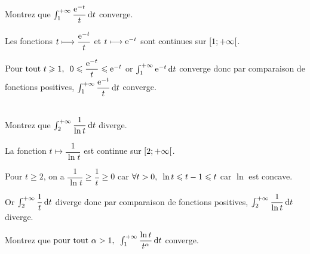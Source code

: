 \begin{exo}~\\
Montrez que \(\int_1^{\pinf}\dfrac{\e{-t}}{t}\odif{t}\) converge.
\end{exo}

\begin{corr}
Les fonctions \(t\longmapsto\dfrac{\mathrm{e}^{-t}}{t}\) et \(t\longmapsto\mathrm{e}^{-t}\) sont continues sur \(\left[1;+\infty\right[\).

\(\quantifs{\Tpt t\geq1}0\leq\dfrac{\e{-t}}{t}\leq\e{-t}\) or \(\int_1^{\pinf}\e{-t}\odif{t}\) converge donc par comparaison de fonctions positives, \(\int_1^{\pinf}\dfrac{\e{-t}}{t}\odif{t}\) converge.
\end{corr}

\begin{exo}~\\
Montrez que \(\int_2^{\pinf}\dfrac{1}{\ln t}\odif{t}\) diverge.
\end{exo}

\begin{corr}
La fonction \(t\mapsto\dfrac{1}{\ln t}\) est continue sur \(\left[2;+\infty\right[\).

Pour \(t\geq2\), on a \(\dfrac{1}{\ln t}\geq\dfrac{1}{t}\geq0\) car \(\quantifs{\forall t>0}\ln t\leq t-1\leq t\) car \(\ln\) est concave.

Or \(\int_2^{\pinf}\dfrac{1}{t}\odif{t}\) diverge donc par comparaison de fonctions positives, \(\int_2^{\pinf}\dfrac{1}{\ln t}\odif{t}\) diverge.
\end{corr}

\begin{exo}
Montrez que \(\quantifs{\tpt\alpha>1}\int_1^{\pinf}\dfrac{\ln t}{t^\alpha}\odif{t}\) converge.
\end{exo}

